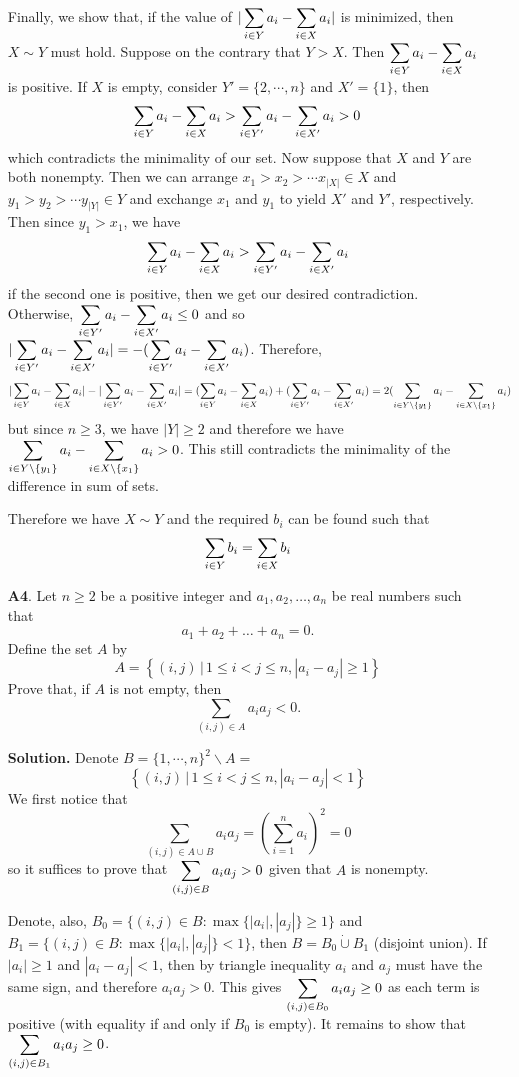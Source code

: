 \documentclass[11pt,a4paper]{article}
\begin{document}
\begin{enumerate}
	Finally, we show that, if the value of $|\displaystyle\sum_{i\in Y}a_i-\displaystyle\sum_{i\in X}a_i|$ is minimized, then $X\sim Y$ must hold. Suppose on the contrary that $Y>X$. Then $\displaystyle\sum_{i\in Y}a_i-\displaystyle\sum_{i\in X}a_i$ is positive. If $X$ is empty, consider $Y'=\{2, \cdots , n\}$ and $X'=\{1\}$, then 
	\[
	\displaystyle\sum_{i\in Y}a_i-\displaystyle\sum_{i\in X}a_i>\displaystyle\sum_{i\in Y'}a_i-\displaystyle\sum_{i\in X'}a_i>0
	\]
	which contradicts the minimality of our set. Now suppose that $X$ and $Y$ are both nonempty. Then we can arrange $x_1>x_2>\cdots x_|X|\in X$ and $y_1>y_2>\cdots y_|Y|\in Y$ and exchange $x_1$ and $y_1$ to yield $X'$ and $Y'$, respectively. Then since $y_1>x_1$, we have 
	\[
	\displaystyle\sum_{i\in Y}a_i-\displaystyle\sum_{i\in X}a_i>\displaystyle\sum_{i\in Y'}a_i-\displaystyle\sum_{i\in X'}a_i
	\]
	if the second one is positive, then we get our desired contradiction. Otherwise, $\displaystyle\sum_{i\in Y'}a_i-\displaystyle\sum_{i\in X'}a_i\le 0$ and so $|\displaystyle\sum_{i\in Y'}a_i-\displaystyle\sum_{i\in X'}a_i|=-(\displaystyle\sum_{i\in Y'}a_i-\displaystyle\sum_{i\in X'}a_i)$. Therefore, 
	\[
	|\displaystyle\sum_{i\in Y}a_i-\displaystyle\sum_{i\in X}a_i| - |\displaystyle\sum_{i\in Y'}a_i-\displaystyle\sum_{i\in X'}a_i|
	= (\displaystyle\sum_{i\in Y}a_i-\displaystyle\sum_{i\in X}a_i) + (\displaystyle\sum_{i\in Y'}a_i-\displaystyle\sum_{i\in X'}a_i)
	=2(\displaystyle\sum_{i\in Y\backslash \{y_1\}}a_i-\displaystyle\sum_{i\in X\backslash\{x_1\}}a_i)
	\]
	but since $n\ge 3$, we have $|Y|\ge 2$ and therefore we have $\displaystyle\sum_{i\in Y\backslash \{y_1\}}a_i-\displaystyle\sum_{i\in X\backslash\{x_1\}}a_i>0$. This still contradicts the minimality of the difference in sum of sets. 
	
	Therefore we have $X\sim Y$ and the required $b_i$ can be found such that 
	\[
	\displaystyle\sum_{i\in Y}b_i = \displaystyle\sum_{i\in X} b_i
	\]
	
	\item [\textbf{A4}.] Let $n\geqslant 2$ be a positive integer and $a_1,a_2, \ldots ,a_n$ be real numbers such that \[a_1+a_2+\dots+a_n=0.\]Define the set $A$ by
	\[A=\left\{(i, j)\,|\,1 \leqslant i<j \leqslant n,\left|a_{i}-a_{j}\right| \geqslant 1\right\}\]Prove that, if $A$ is not empty, then
	\[\sum_{(i, j) \in A} a_{i} a_{j}<0.\]
	
	\textbf{Solution.} Denote $B=\{1, \cdots , n\}^2\backslash A = $
	\[
	\left\{(i, j)\,|\,1 \leqslant i<j \leqslant n,\left|a_{i}-a_{j}\right| < 1\right\}
	\]
	We first notice that 
	\[
	\sum_{(i, j) \in A\cup B} a_{i} a_{j}
	=(\sum_{i=1}^n a_i)^2
	=0
	\]
	so it suffices to prove that $\displaystyle\sum_{(i, j) \in B} a_{i} a_{j}>0$ given that $A$ is nonempty. 
	
	Denote, also, $B_0=\{(i, j)\in B: \max\{|a_i|, |a_j|\}\ge 1\}$ and $B_1=\{(i, j)\in B: \max\{|a_i|, |a_j|\}< 1\}$, then $B=B_0\dot\cup B_1$ (disjoint union). If $|a_i|\ge 1$ and $|a_i-a_j|<1$, then by triangle inequality $a_i$ and $a_j$ must have the same sign, and therefore $a_ia_j>0$. This gives $\displaystyle\sum_{(i, j) \in B_0} a_{i} a_{j}\ge 0$ as each term is positive (with equality if and only if $B_0$ is empty). It remains to show that $\displaystyle\sum_{(i, j) \in B_1}a_ia_j\ge 0$. 
	

\end{enumerate}
\end{document}
